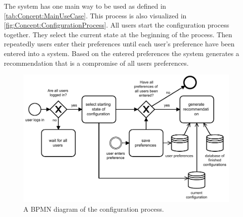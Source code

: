 The system has one main way to be used as defined in \autoref{tab:Concept:MainUseCase}. This process is also visualized in \autoref{fig:Concept:ConfigurationProcess}. All users start the configuration process together.
They select the current state at the beginning of the process. Then repeatedly users enter their preferences until each user's preference have been entered into a system. Based on the entered preferences the system generates a recommendation that is a compromise of all users preferences.

\begin{figure}
    \centering
    \includegraphics[width=1\textwidth]{./figures/40_concept/bpmn_configuration_process_with_continious_recommendation.pdf}
    \caption{A BPMN diagram of the configuration process.}
    \label{fig:Concept:ConfigurationProcess}
\end{figure}


